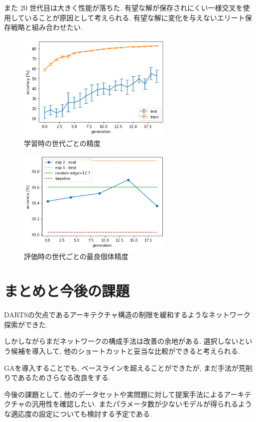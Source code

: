 \documentclass[twocolumn]{jarticle}     %
\begin{document}
また 20 世代目は大きく性能が落ちた. 有望な解が保存されにくい一様交叉を使用していることが原因として考えられる. 有望な解に変化を与えないエリート保存戦略と組み合わせたい.

\begin{figure}[t]
  \includegraphics[clip, width=75mm]{gen_acc.png}
  \caption{学習時の世代ごとの精度}
  \label{fig:gene_acc}
\end{figure}

\begin{figure}[t]
  \includegraphics[clip, width=75mm]{gen_com.png}
  \caption{評価時の世代ごとの最良個体精度}
  \label{fig:gene_com}
\end{figure}

\section{まとめと今後の課題}
DARTSの欠点であるアーキテクチャ構造の制限を緩和するようなネットワーク探索ができた.

しかしながらまだネットワークの構成手法は改善の余地がある.
選択しないという候補を導入して, 他のショートカットと妥当な比較ができると考えられる.

GAを導入することでも, ベースラインを超えることができたが,
まだ手法が荒削りであるためさらなる改良をする.

今後の課題として, 他のデータセットや実問題に対して提案手法によるアーキテクチャの汎用性を確認したい.
またパラメータ数が少ないモデルが得られるような適応度の設定についても検討する予定である.



\end{document}

